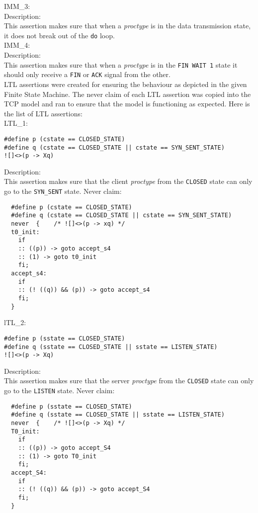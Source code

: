 \documentclass{WigReport}
\begin{document}
IMM\_3:\\
Description:\\
This assertion makes sure that when a \textit{proctype} is in the data transmission state, it does not break out of the \verb|do| loop.
\\

IMM\_4:\\
Description:\\
This assertion makes sure that when a \textit{proctype} is in the \verb|FIN WAIT 1| state it should only receive a \verb|FIN| or \verb|ACK| signal from the other.
\\

LTL assertions were created for ensuring the behaviour as depicted in the given Finite State Machine. The never claim of each LTL assertion was copied into the TCP model and ran to ensure that the model is functioning as expected. Here is the list of LTL assertions:
\\

LTL\_1:\\
\begin{lstlisting}
#define p (cstate == CLOSED_STATE)
#define q (cstate == CLOSED_STATE || cstate == SYN_SENT_STATE)
![]<>(p -> Xq)
\end{lstlisting}
Description:\\
This assertion makes sure that the client \textit{proctype} from the \verb|CLOSED| state can only go to the \verb|SYN_SENT| state.
Never claim:\\
\begin{lstlisting}
  #define p (cstate == CLOSED_STATE)
  #define q (cstate == CLOSED_STATE || cstate == SYN_SENT_STATE)
  never  {    /* ![]<>(p -> xq) */
  t0_init:
    if
    :: ((p)) -> goto accept_s4
    :: (1) -> goto t0_init
    fi;
  accept_s4:
    if
    :: (! ((q)) && (p)) -> goto accept_s4
    fi;
  }
\end{lstlisting}

lTL\_2:\\
\begin{lstlisting}
#define p (sstate == CLOSED_STATE)
#define q (sstate == CLOSED_STATE || sstate == LISTEN_STATE)
![]<>(p -> Xq)
\end{lstlisting}
Description:\\
This assertion makes sure that the server \textit{proctype} from the \verb|CLOSED| state can only go to the \verb|LISTEN| state.
Never claim:\\
\begin{lstlisting}
  #define p (sstate == CLOSED_STATE)
  #define q (sstate == CLOSED_STATE || sstate == LISTEN_STATE)
  never  {    /* ![]<>(p -> Xq) */
  T0_init:
    if
    :: ((p)) -> goto accept_S4
    :: (1) -> goto T0_init
    fi;
  accept_S4:
    if
    :: (! ((q)) && (p)) -> goto accept_S4
    fi;
  }
\end{lstlisting}
\end{document}

